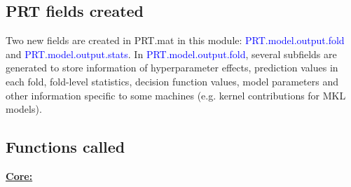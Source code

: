 

\subsection{PRT fields created}

Two new fields are created in PRT.mat in this module: \textcolor{blue}{PRT.model.output.fold} and \textcolor{blue}{PRT.model.output.stats}. In \textcolor{blue}{PRT.model.output.fold}, several subfields are generated to store information of hyperparameter effects, prediction values in each fold, fold-level statistics, decision function values, model parameters and other information specific to some machines (e.g. kernel contributions for MKL models).
\\


\subsection{Functions called}

\textbf{\underline{Core:}}

